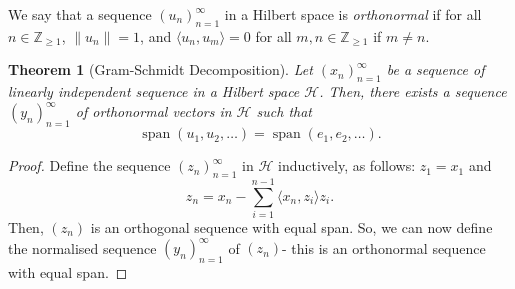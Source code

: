 \documentclass[a4paper, openany]{memoir}
\theoremstyle{definition}
\theoremstyle{plain}
\newtheorem{theorem}[definition]{Theorem}
\begin{document}
    We say that a sequence $(u_n)_{n=1}^\infty$ in a Hilbert space is \emph{orthonormal} if for all $n \in \mathbb{Z}_{\geq 1}$, $\lVert u_n \rVert = 1$, and $\langle u_n, u_m \rangle = 0$ for all $m, n \in \mathbb{Z}_{\geq 1}$ if $m \neq n$.

    \begin{theorem}[Gram-Schmidt Decomposition]
        Let $(x_n)_{n=1}^\infty$ be a sequence of linearly independent sequence in a Hilbert space $\mathcal{H}$. Then, there exists a sequence $(y_n)_{n=1}^\infty$ of orthonormal vectors in $\mathcal{H}$ such that 
        \[\operatorname{span}(u_1, u_2, \dots) = \operatorname{span}(e_1, e_2, \dots).\]
    \end{theorem}
    \begin{proof}
        Define the sequence $(z_n)_{n=1}^\infty$ in $\mathcal{H}$ inductively, as follows: $z_1 = x_1$ and 
        \[z_n = x_n - \sum_{i=1}^{n-1} \langle x_n, z_i \rangle z_i.\]
        Then, $(z_n)$ is an orthogonal sequence with equal span. So, we can now define the normalised sequence $(y_n)_{n=1}^\infty$ of $(z_n)$- this is an orthonormal sequence with equal span.
    \end{proof}
\end{document}
